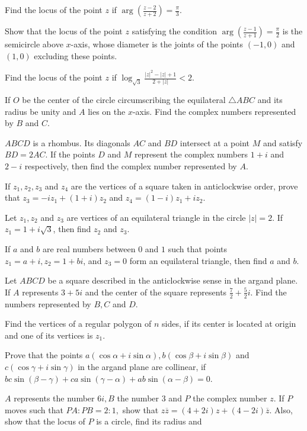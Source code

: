 \item Find the locus of the point $z$ if $\arg\left(\frac{z - 2}{z + 2}\right) = \frac{\pi}{3}$.
\item Show that the locus of the point $z$ satisfying the condition $\arg\left(\frac{z - 1}{z + 1}\right) = \frac{\pi}{2}$ is the
  semicircle above $x$-axis, whose diameter is the joints of the points $(-1, 0)$ and $(1, 0)$ excluding these points.
\item Find the locus of the point $z$ if $\log_{\sqrt{3}}\frac{|z|^2 - |z| + 1}{2 + |z|} < 2$.
\item If $O$ be the center of the circle circumscribing the equilateral $\triangle ABC$ and its radius be unity and $A$ lies on the
  $x$-axis. Find the complex numbers represented by $B$ and $C$.
\item $ABCD$ is a rhombus. Its diagonals $AC$ and $BD$ intersect at a point $M$ and satisfy $BD = 2AC$. If the points $D$ and $M$
  represent the complex numbers $1 + i$ and $2 - i$ respectively, then find the complex number represented by $A$.
\item If $z_1, z_2 , z_3$ and $z_4$ are the vertices of a square taken in anticlockwise order, prove that $z_3 = -iz_1 + (1 +
  i)z_2$ and $z_4 = (1 - i)z_1 + iz_2$.
\item Let $z_1, z_2$ and $z_3$ are vertices of an equilateral triangle in the circle $|z| = 2$. If $z_1 = 1 + i\sqrt{3}$, then find
  $z_2$ and $z_3$.
\item If $a$ and $b$ are real numbers between $0$ and $1$ such that points $z_1 = a + i, z_2 = 1 + bi$, and $z_3 = 0$ form an
  equilateral triangle, then find $a$ and $b$.
\item Let $ABCD$ be a square described in the anticlockwise sense in the argand plane. If $A$ represents $3 + 5i$ and the center of
  the square represents $\frac{7}{2} + \frac{5}{2}i$. Find the numbers represented by $B, C$ and $D$.
\item Find the vertices of a regular polygon of $n$ sides, if its center is located at origin and one of its vertices is $z_1$.
\item Prove that the points $a(\cos\alpha + i\sin\alpha), b(\cos\beta + i\sin\beta)$ and $c(\cos\gamma + i\sin\gamma)$ in the argand
  plane are collinear, if $bc\sin(\beta - \gamma) + ca\sin(\gamma - \alpha) + ab\sin(\alpha - \beta) = 0$.
\item $A$ represents the number $6i, B$ the number $3$ and $P$ the complex number $z$. If $P$ moves such that $PA:PB = 2:1,$ show
  that $z\overline{z} = (4 + 2i)z + (4 - 2i)\overline{z}$. Also, show that the locus of $P$ is a circle, find its radius and
